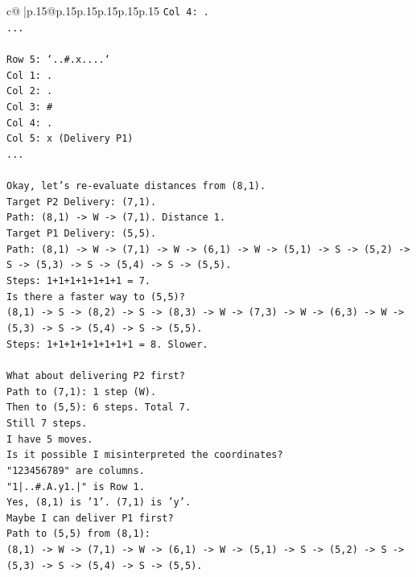 \documentclass{article}
\begin{document}
{\begin{supertabular}{c@{$\;$}|p{.15\linewidth}@{}p{.15\linewidth}p{.15\linewidth}p{.15\linewidth}p{.15\linewidth}p{.15\linewidth}}
{{{\texttt{Col 4: .} \\
\texttt{...} \\
\\ 
\texttt{Row 5: `..\#.x....`} \\
\texttt{Col 1: .} \\
\texttt{Col 2: .} \\
\texttt{Col 3: \#} \\
\texttt{Col 4: .} \\
\texttt{Col 5: x (Delivery P1)} \\
\texttt{...} \\
\\ 
\texttt{Okay, let's re{-}evaluate distances from (8,1).} \\
\texttt{Target P2 Delivery: (7,1).} \\
\texttt{Path: (8,1) {-}> W {-}> (7,1). Distance 1.} \\
\texttt{Target P1 Delivery: (5,5).} \\
\texttt{Path: (8,1) {-}> W {-}> (7,1) {-}> W {-}> (6,1) {-}> W {-}> (5,1) {-}> S {-}> (5,2) {-}> S {-}> (5,3) {-}> S {-}> (5,4) {-}> S {-}> (5,5).} \\
\texttt{Steps: 1+1+1+1+1+1+1 = 7.} \\
\texttt{Is there a faster way to (5,5)?} \\
\texttt{(8,1) {-}> S {-}> (8,2) {-}> S {-}> (8,3) {-}> W {-}> (7,3) {-}> W {-}> (6,3) {-}> W {-}> (5,3) {-}> S {-}> (5,4) {-}> S {-}> (5,5).} \\
\texttt{Steps: 1+1+1+1+1+1+1+1 = 8. Slower.} \\
\\ 
\texttt{What about delivering P2 first?} \\
\texttt{Path to (7,1): 1 step (W).} \\
\texttt{Then to (5,5): 6 steps. Total 7.} \\
\texttt{Still 7 steps.} \\
\texttt{I have 5 moves.} \\
\texttt{Is it possible I misinterpreted the coordinates?} \\
\texttt{"123456789" are columns.} \\
\texttt{"1|..\#.A.y1.|" is Row 1.} \\
\texttt{Yes, (8,1) is '1'. (7,1) is 'y'.} \\
\texttt{Maybe I can deliver P1 first?} \\
\texttt{Path to (5,5) from (8,1):} \\
\texttt{(8,1) {-}> W {-}> (7,1) {-}> W {-}> (6,1) {-}> W {-}> (5,1) {-}> S {-}> (5,2) {-}> S {-}> (5,3) {-}> S {-}> (5,4) {-}> S {-}> (5,5).} \\
}}}
\end{supertabular}}
\end{document}
